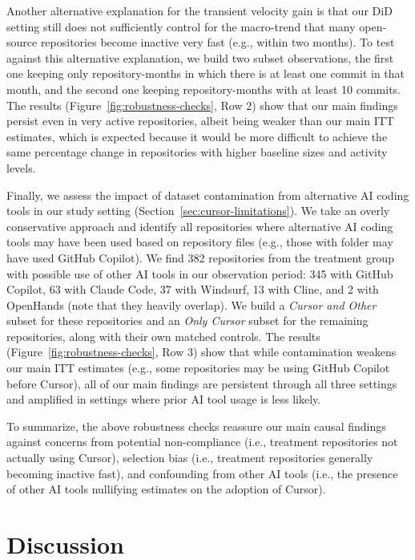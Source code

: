 Another alternative explanation for the transient velocity gain is that our DiD setting still does not sufficiently control for the macro-trend that many open-source repositories become inactive very fast (e.g., within two months).
To test against this alternative explanation, we build two subset observations, the first one keeping only repository-months in which there is at least one commit in that month, and the second one keeping repository-months with at least 10 commits.
The results (Figure~\ref{fig:robustness-checks}, Row 2) show that our main findings persist even in very active repositories, albeit being weaker than our main ITT estimates, which is expected because it would be more difficult to achieve the same percentage change in repositories with higher baseline sizes and activity levels.

Finally, we assess the impact of dataset contamination from alternative AI coding tools in our study setting (Section~\ref{sec:cursor-limitations}).
We take an overly conservative approach and identify all repositories where alternative AI coding tools may have been used based on repository files (e.g., those with  folder may have used GitHub Copilot).
We find 382 repositories from the treatment group with possible use of other AI tools in our observation period: 345 with GitHub Copilot, 63 with Claude Code, 37 with Windsurf, 13 with Cline, and 2 with OpenHands (note that they heavily overlap).
We build a \emph{Cursor and Other} subset for these repositories and an \emph{Only Cursor} subset for the remaining repositories, along with their own matched controls.
The results (Figure~\ref{fig:robustness-checks}, Row 3) show that while contamination weakens our main ITT estimates (e.g., some repositories may be using GitHub Copilot before Cursor), all of our main findings are persistent through all three settings and amplified in settings where prior AI tool usage is less likely. 

To summarize, the above robustness checks reassure our main causal findings against concerns from potential non-compliance (i.e., treatment repositories not actually using Cursor), selection bias (i.e., treatment repositories generally becoming inactive fast), and confounding from other AI tools (i.e., the presence of other AI tools nullifying estimates on the adoption of Cursor).



\section{Discussion}
\label{sec:cursor-discussion}

